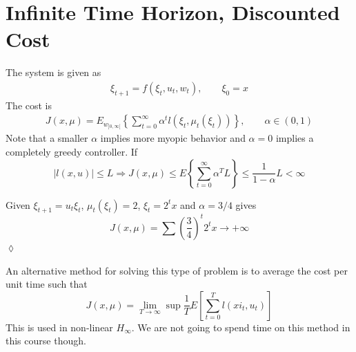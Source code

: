 \section{Infinite Time Horizon, Discounted Cost}
The system is given as
\begin{align*}
\xi_{t+1} = f(\xi_t,u_t,w_t), \qquad \xi_0 = x
\end{align*}
The cost is
\begin{align*}
J(x,\mu) = E_{w_{]0,\infty[}}\left\lbrace\sum_{t=0}^\infty \alpha^t l(\xi_t,\mu_t(\xi_t))\right\rbrace, \qquad \alpha\in(0,1)%
\end{align*}
Note that a smaller $\alpha$ implies more myopic behavior and $\alpha=0$ implies a completely greedy controller.
If
$$|l(x,u)|\leq L \Rightarrow J(x,\mu)\leq E\left\lbrace\sum_{t=0}^\infty \alpha^T L\right\rbrace \leq \frac{1}{1-\alpha}L<\infty$$

\begin{example}
Given $\xi_{t+1}=u_t\xi_t$, $\mu_t(\xi_t)=2$, $\xi_t=2^t x$ and $\alpha=3/4$ gives
  $$J(x,\mu) = \sum{\left(\frac{3}{4}\right)}^t 2^t x\to+\infty$$
$\lozenge$
\end{example}

An alternative method for solving this type of problem is to average the cost per unit time such that
$$J(x,\mu) = \lim_{T\to\infty}\sup \frac{1}{T}E\left[\sum_{t=0}^T l(xi_t,u_t)\right]$$
This is used in non-linear $H_\infty$.
We are not going to spend time on this method in this course though.

